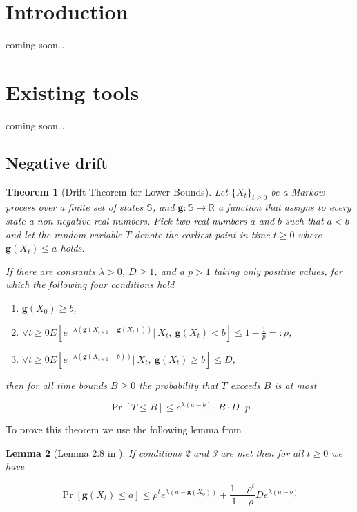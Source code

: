 \documentclass[12pt, a4paper]{article}
\title{\text{Additive drift with tail bounds}}
\author{Vihnin F.
    \and Antipov D.
    \and Sinyachenko N.}
\newcommand{\gfun}{\mathbf{g}}
\newtheorem{theorem}{Theorem}[section]
\newtheorem{lemma}[theorem]{Lemma}
\theoremstyle{remark}
\newcommand{\cm}{coming soon\dots}
\begin{document}
\maketitle

\section{Introduction}
\cm

\section{Existing tools}
\cm
\subsection{Negative drift}
\begin{theorem}[Drift Theorem for Lower Bounds] \label{thm:neat}
    Let $\{X_t\}_{t \ge 0}$ be a Markow process over a finite set of states $\mathbb{S}$, and $\mathbf{g} : \mathbb{S} \rightarrow \mathbb{R}$ a function that assigns to every state a non-negative real numbers. Pick two real numbers $a$ and $b$ such that $a < b$ and let the random variable $T$ denote
    the earliest point in time $t \ge 0$ where $\mathbf{g}(X_t) \leq a$ holds.

    If there are constants $\lambda > 0$, $D \ge 1$, and a $p > 1$ taking only positive values, for which the following four conditions hold
    \renewcommand\labelenumi{(\theenumi)}
    \begin{enumerate}
        \item $\gfun(X_0) \ge b$,
        \item $\forall t \ge 0 E\left[e^{-\lambda(\gfun(X_{t + 1} - \gfun(X_t)))} |\ X_t,\ \gfun(X_t) < b\right] \leq 1 - \frac{1}{p} =: \rho$,
        \item $\forall t \ge 0 E\left[e^{-\lambda(\gfun(X_{t + 1} - b))} |\ X_t,\ \gfun(X_t) \ge b\right] \leq D$,
    \end{enumerate}
    then for all time bounds $B \ge 0$ the probability that $T$ exceeds $B$ is at most

    \begin{equation}
        \Pr[T \leq B] \leq e^{\lambda(a - b)} \cdot B \cdot D \cdot p
    \end{equation}
\end{theorem}

To prove this theorem we use the following lemma from \cite{Hajek 82}

\begin{lemma}[Lemma 2.8 in \cite{Hajek 82}] \label{lm:haj}
    If conditions 2 and 3 are met then for all $t \geq 0$ we have

    $$\Pr[\gfun(X_t) \leq a] \leq \rho^te^{\lambda(a - \gfun(X_0))} + \frac{1 - \rho^t}{1 - \rho} D e^{\lambda(a - b)}$$

\end{lemma}
\end{document}
